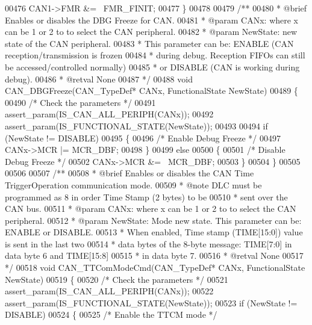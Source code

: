 \begin{DoxyCode}
00476   CAN1->FMR &= ~FMR_FINIT;
00477 \}
00478 
00479 \textcolor{comment}{/**}
00480 \textcolor{comment}{  * @brief  Enables or disables the DBG Freeze for CAN.}
00481 \textcolor{comment}{  * @param  CANx: where x can be 1 or 2 to to select the CAN peripheral.}
00482 \textcolor{comment}{  * @param  NewState: new state of the CAN peripheral. }
00483 \textcolor{comment}{  *          This parameter can be: ENABLE (CAN reception/transmission is frozen}
00484 \textcolor{comment}{  *          during debug. Reception FIFOs can still be accessed/controlled normally) }
00485 \textcolor{comment}{  *          or DISABLE (CAN is working during debug).}
00486 \textcolor{comment}{  * @retval None}
00487 \textcolor{comment}{  */}
00488 \textcolor{keywordtype}{void} CAN_DBGFreeze(CAN\_TypeDef* CANx, FunctionalState NewState)
00489 \{
00490   \textcolor{comment}{/* Check the parameters */}
00491   assert_param(IS\_CAN\_ALL\_PERIPH(CANx));
00492   assert_param(IS\_FUNCTIONAL\_STATE(NewState));
00493 
00494   \textcolor{keywordflow}{if} (NewState != DISABLE)
00495   \{
00496     \textcolor{comment}{/* Enable Debug Freeze  */}
00497     CANx->MCR |= MCR_DBF;
00498   \}
00499   \textcolor{keywordflow}{else}
00500   \{
00501     \textcolor{comment}{/* Disable Debug Freeze */}
00502     CANx->MCR &= ~MCR_DBF;
00503   \}
00504 \}
00505 
00506 
00507 \textcolor{comment}{/**}
00508 \textcolor{comment}{  * @brief  Enables or disables the CAN Time TriggerOperation communication mode.}
00509 \textcolor{comment}{  * @note   DLC must be programmed as 8 in order Time Stamp (2 bytes) to be }
00510 \textcolor{comment}{  *         sent over the CAN bus.  }
00511 \textcolor{comment}{  * @param  CANx: where x can be 1 or 2 to to select the CAN peripheral.}
00512 \textcolor{comment}{  * @param  NewState: Mode new state. This parameter can be: ENABLE or DISABLE.}
00513 \textcolor{comment}{  *         When enabled, Time stamp (TIME[15:0]) value is  sent in the last two}
00514 \textcolor{comment}{  *         data bytes of the 8-byte message: TIME[7:0] in data byte 6 and TIME[15:8] }
00515 \textcolor{comment}{  *         in data byte 7. }
00516 \textcolor{comment}{  * @retval None}
00517 \textcolor{comment}{  */}
00518 \textcolor{keywordtype}{void} CAN_TTComModeCmd(CAN\_TypeDef* CANx, FunctionalState NewState)
00519 \{
00520   \textcolor{comment}{/* Check the parameters */}
00521   assert_param(IS\_CAN\_ALL\_PERIPH(CANx));
00522   assert_param(IS\_FUNCTIONAL\_STATE(NewState));
00523   \textcolor{keywordflow}{if} (NewState != DISABLE)
00524   \{
00525     \textcolor{comment}{/* Enable the TTCM mode */}

\end{DoxyCode}

